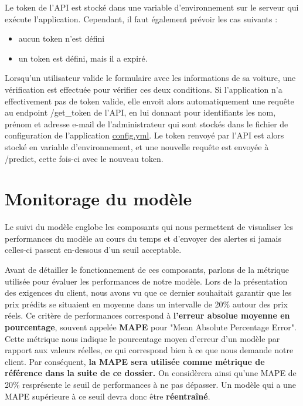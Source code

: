 \documentclass[french]{article}
\begin{document}
    Le token de l'API est stocké dans une variable d'environnement sur le serveur qui exécute l'application. Cependant, il faut également prévoir les cas suivants :
    \begin{itemize}
        \item aucun token n'est défini
        \item un token est défini, mais il a expiré.
    \end{itemize}

    Lorsqu'un utilisateur valide le formulaire avec les informations de sa voiture, une vérification est effectuée pour vérifier ces deux conditions. Si l'application n'a effectivement pas de token valide, elle envoit alors automatiquement une requête au endpoint /get\_token de l'API, en lui donnant pour identifiants les nom, prénom et adresse e-mail de l'administrateur qui sont stockés dans le fichier de configuration de l'application \href{https://github.com/vinpap/iargus_app/blob/386366798c97bc3b68ac874ca10d640cb5d20902/config.yml}{config.yml}. Le token renvoyé par l'API est alors stocké en variable d'environnement, et une nouvelle requête est envoyée à /predict, cette fois-ci avec le nouveau token.

    \section{Monitorage du modèle}

    Le suivi du modèle englobe les composants qui nous permettent de visualiser les performances du modèle au cours du temps et d'envoyer des alertes si jamais celles-ci passent en-dessous d'un seuil acceptable. 
    
    Avant de détailler le fonctionnement de ces composants, parlons de la métrique utilisée pour évaluer les performances de notre modèle. Lors de la présentation des exigences du client, nous avons vu que ce dernier souhaitait garantir que les prix prédits se situaient en moyenne dans un intervalle de 20\% autour des prix réels. Ce critère de performances correspond à \textbf{l'erreur absolue moyenne en pourcentage}, souvent appelée \textbf{MAPE} pour "Mean Absolute Percentage Error". Cette métrique nous indique le pourcentage moyen d'erreur d'un modèle par rapport aux valeurs réelles, ce qui correspond bien à ce que nous demande notre client. Par conséquent, \textbf{la MAPE sera utilisée comme métrique de référence dans la suite de ce dossier.} On considèrera ainsi qu'une MAPE de 20\% resprésente le seuil de performances à ne pas dépasser. Un modèle qui a une MAPE supérieure à ce seuil devra donc être \textbf{réentraîné}.
\end{document}
